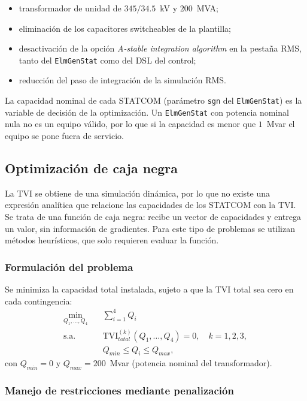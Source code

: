 \begin{itemize}
    \item transformador de unidad de $345/34.5$~kV y $200$~MVA;
    \item eliminación de los capacitores switcheables de la plantilla;
    \item desactivación de la opción \textit{A-stable integration algorithm} en la pestaña RMS, tanto del \texttt{ElmGenStat} como del DSL del control;
    \item reducción del paso de integración de la simulación RMS.
\end{itemize}

La capacidad nominal de cada STATCOM (parámetro \texttt{sgn} del \texttt{ElmGenStat}) es la variable de decisión de la optimización. Un \texttt{ElmGenStat} con potencia nominal nula no es un equipo válido, por lo que si la capacidad es menor que $1$~Mvar el equipo se pone fuera de servicio.

\subsection{Optimización de caja negra}

La TVI se obtiene de una simulación dinámica, por lo que no existe una expresión analítica que relacione las capacidades de los STATCOM con la TVI. Se trata de una función de caja negra: recibe un vector de capacidades y entrega un valor, sin información de gradientes. Para este tipo de problemas se utilizan métodos heurísticos, que solo requieren evaluar la función.

\subsubsection{Formulación del problema}

Se minimiza la capacidad total instalada, sujeto a que la TVI total sea cero en cada contingencia:
\begin{align}
    \min_{Q_1,\dots,Q_4} \quad & \sum_{i=1}^{4} Q_i \\
    \text{s.a.} \quad & \mathrm{TVI}_{total}^{(k)}(Q_1,\dots,Q_4) = 0, \quad k = 1,2,3, \\
    & Q_{min} \le Q_i \le Q_{max},
\end{align}
con $Q_{min} = 0$ y $Q_{max} = 200$~Mvar (potencia nominal del transformador).

\subsubsection{Manejo de restricciones mediante penalización}

